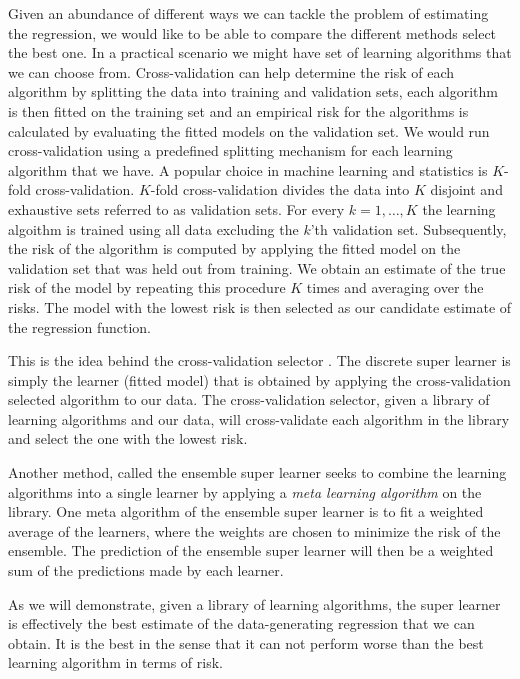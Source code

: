 \documentclass[11pt, a4paper]{article}
\theoremstyle{definition}
\theoremstyle{remark}
\begin{document}
Given an abundance of different ways we can tackle the problem of estimating the regression, we would like to be able to compare the different methods select the best one. In a practical scenario we might have set of learning algorithms that we can choose from. Cross-validation can help determine the risk of each algorithm by splitting the data into training and validation sets, each algorithm is then fitted on the training set and an empirical risk for the algorithms is calculated by evaluating the fitted models on the validation set. We would run cross-validation using a predefined splitting mechanism for each learning algorithm that we have. A popular choice in machine learning and statistics is $ K $-fold cross-validation. $ K $-fold cross-validation divides the data into $ K $ disjoint and exhaustive sets referred to as validation sets. For every $ k = 1, \dots , K $ the learning algoithm is trained using all data excluding the $ k $'th validation set. Subsequently, the risk of the algorithm is computed by applying the fitted model on the validation set that was held out from training. We obtain an estimate of the true risk of the model by repeating this procedure $ K $ times and averaging over the risks. The model with the lowest risk is then selected as our candidate estimate of the regression function. 

This is the idea behind the cross-validation selector \parencite{laan03}. The discrete super learner \parencite{van2007super} is simply the learner (fitted model) that is obtained by applying the cross-validation selected algorithm to our data. The cross-validation selector, given a library of learning algorithms and our data, will cross-validate each algorithm in the library and select the one with the lowest risk. 

Another method, called the ensemble super learner \parencite{van2007super} seeks to combine the learning algorithms into a single learner by applying a \textit{meta learning algorithm} on the library. One meta algorithm of the ensemble super learner is to fit a weighted average of the learners, where the weights are chosen to minimize the risk of the ensemble. The prediction of the ensemble super learner will then be a weighted sum of the predictions made by each learner.

As we will demonstrate, given a library of learning algorithms, the super learner is effectively the best estimate of the data-generating regression that we can obtain. It is the best in the sense that it can not perform worse than the best learning algorithm in terms of risk. 
\end{document}
